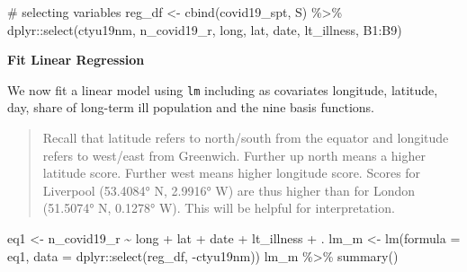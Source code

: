 \documentclass[
  letterpaper,
  krantz2]{style/krantz}
\newenvironment{Shaded}{\begin{snugshade}}{\end{snugshade}}
\newcommand{\AttributeTok}[1]{\textcolor[rgb]{0.40,0.45,0.13}{#1}}
\newcommand{\CommentTok}[1]{\textcolor[rgb]{0.37,0.37,0.37}{#1}}
\newcommand{\FunctionTok}[1]{\textcolor[rgb]{0.28,0.35,0.67}{#1}}
\newcommand{\NormalTok}[1]{\textcolor[rgb]{0.00,0.23,0.31}{#1}}
\newcommand{\OtherTok}[1]{\textcolor[rgb]{0.00,0.23,0.31}{#1}}
\newcommand{\SpecialCharTok}[1]{\textcolor[rgb]{0.37,0.37,0.37}{#1}}
\begin{document}
\begin{Shaded}
\begin{Highlighting}[]
\CommentTok{\# selecting variables}
\NormalTok{reg\_df }\OtherTok{\textless{}{-}} \FunctionTok{cbind}\NormalTok{(covid19\_spt, S) }\SpecialCharTok{\%\textgreater{}\%}
\NormalTok{  dplyr}\SpecialCharTok{::}\FunctionTok{select}\NormalTok{(ctyu19nm, n\_covid19\_r, long, lat, date, lt\_illness, B1}\SpecialCharTok{:}\NormalTok{B9)}
\end{Highlighting}
\end{Shaded}

\textbf{Fit Linear Regression}

We now fit a linear model using \texttt{lm} including as covariates
longitude, latitude, day, share of long-term ill population and the nine
basis functions.

\begin{quote}
Recall that latitude refers to north/south from the equator and
longitude refers to west/east from Greenwich. Further up north means a
higher latitude score. Further west means higher longitude score. Scores
for Liverpool (53.4084° N, 2.9916° W) are thus higher than for London
(51.5074° N, 0.1278° W). This will be helpful for interpretation.
\end{quote}

\begin{Shaded}
\begin{Highlighting}[]
\NormalTok{eq1 }\OtherTok{\textless{}{-}}\NormalTok{ n\_covid19\_r }\SpecialCharTok{\textasciitilde{}}\NormalTok{ long }\SpecialCharTok{+}\NormalTok{ lat }\SpecialCharTok{+}\NormalTok{ date }\SpecialCharTok{+}\NormalTok{ lt\_illness }\SpecialCharTok{+}\NormalTok{ .}
\NormalTok{lm\_m }\OtherTok{\textless{}{-}} \FunctionTok{lm}\NormalTok{(}\AttributeTok{formula =}\NormalTok{ eq1, }
           \AttributeTok{data =}\NormalTok{ dplyr}\SpecialCharTok{::}\FunctionTok{select}\NormalTok{(reg\_df, }\SpecialCharTok{{-}}\NormalTok{ctyu19nm))}
\NormalTok{lm\_m }\SpecialCharTok{\%\textgreater{}\%} \FunctionTok{summary}\NormalTok{()}
\end{Highlighting}
\end{Shaded}
\end{document}
